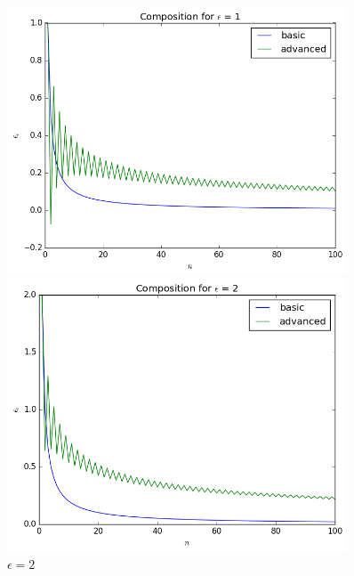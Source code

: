 \documentclass[12pt]{article}
\theoremstyle{definition}
\begin{document}
\begin{figure}[H]
    \centering
    \begin{minipage}{0.5\textwidth}
        \centering
        \includegraphics[width=0.9\textwidth]{advanced_composition_1.png}
        \caption{$\epsilon = 1$}
        \label{fig:advanced_1}
    \end{minipage}\hfill
    \begin{minipage}{0.5\textwidth}
        \centering
        \includegraphics[width=0.9\textwidth]{advanced_composition_2.png}
        \caption{$\epsilon = 2$}
        \label{fig:advanced_2}
    \end{minipage} \hfill
\end{figure}
\end{document}
